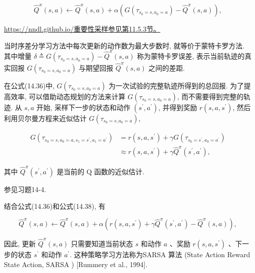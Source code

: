 \documentclass[10pt]{article}
\begin{document}
\begin{equation*}
\hat{Q}^{\pi}(s, a) \leftarrow \hat{Q}^{\pi}(s, a)+\alpha\left(G\left(\tau_{s_{0}=s, a_{0}=a}\right)-\hat{Q}^{\pi}(s, a)\right), \tag{14.36}
\end{equation*}


\href{https://nndl.github.io/%E9%87%8D%E8%A6%81%E6%80%A7%E9%87%87%E6%A0%B7%E5%8F%82%E8%A7%81%E7%AC%AC11.5.3%E8%8A%82%E3%80%82}{https://nndl.github.io/重要性采样参见第11.5.3节。}

当时序差分学习方法中每次更新的动作数为最大步数时, 就等价于蒙特卡罗方法.\\
其中增量 $\delta \triangleq G\left(\tau_{s_{0}=s, a_{0}=a}\right)-\hat{Q}^{\pi}(s, a)$ 称为蒙特卡罗误差, 表示当前轨迹的真实回报 $G\left(\tau_{s_{0}=s, a_{0}=a}\right)$ 与期望回报 $\hat{Q}^{\pi}(s, a)$ 之间的差距.

在公式(14.36)中, $G\left(\tau_{s_{0}=s, a_{0}=a}\right)$ 为一次试验的完整轨迹所得到的总回报. 为了提高效率, 可以借助动态规划的方法来计算 $G\left(\tau_{s_{0}=s, a_{0}=a}\right)$, 而不需要得到完整的轨迹. 从 $s, a$ 开始, 采样下一步的状态和动作 $\left(s^{\prime}, a^{\prime}\right)$, 并得到奖励 $r\left(s, a, s^{\prime}\right)$, 然后利用贝尔曼方程来近似估计 $G\left(\tau_{s_{0}=s, a_{0}=a}\right)$,


\begin{align*}
G\left(\tau_{s_{0}=s, a_{0}=a, s_{1}=s^{\prime}, a_{1}=a^{\prime}}\right) & =r\left(s, a, s^{\prime}\right)+\gamma G\left(\tau_{s_{0}=s^{\prime}, a_{0}=a^{\prime}}\right)  \tag{14.37}\\
& \approx r\left(s, a, s^{\prime}\right)+\gamma \hat{Q}^{\pi}\left(s^{\prime}, a^{\prime}\right), \tag{14.38}
\end{align*}


其中 $\hat{Q}^{\pi}\left(s^{\prime}, a^{\prime}\right)$ 是当前的 $\mathrm{Q}$ 函数的近似估计.

参见习题14-4.

结合公式(14.36)和公式(14.38), 有


\begin{equation*}
\hat{Q}^{\pi}(s, a) \leftarrow \hat{Q}^{\pi}(s, a)+\alpha\left(r\left(s, a, s^{\prime}\right)+\gamma \hat{Q}^{\pi}\left(s^{\prime}, a^{\prime}\right)-\hat{Q}^{\pi}(s, a)\right), \tag{14.39}
\end{equation*}


因此, 更新 $\hat{Q}^{\pi}(s, a)$ 只需要知道当前状态 $s$ 和动作 $a$ 、奖励 $r\left(s, a, s^{\prime}\right)$ 、下一步的状态 $s^{\prime}$ 和动作 $a^{\prime}$. 这种策略学习方法称为SARSA 算法 (State Action Reward State Action, SARSA ) [Rummery et al., 1994].
\end{document}
